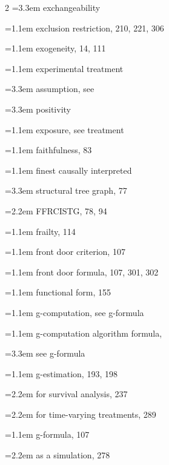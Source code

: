 \begin{multicols}{2}
\hspace*{2.2em}\hangindent=3.3em exchangeability\par
\hangindent=1.1em exclusion restriction, 210, 221, 306\par
\hangindent=1.1em exogeneity, 14, 111\par
\hangindent=1.1em experimental treatment\par
\hspace*{2.2em}\hangindent=3.3em assumption, see\par
\hspace*{2.2em}\hangindent=3.3em positivity\par
\hangindent=1.1em exposure, see treatment\par
\hangindent=1.1em faithfulness, 83\par
\hangindent=1.1em finest causally interpreted\par
\hspace*{2.2em}\hangindent=3.3em structural tree graph, 77\par
\hspace*{1.1em}\hangindent=2.2em FFRCISTG, 78, 94\par
\hangindent=1.1em frailty, 114\par
\hangindent=1.1em front door criterion, 107\par
\hangindent=1.1em front door formula, 107, 301, 302\par
\hangindent=1.1em functional form, 155\par
\hangindent=1.1em g-computation, see g-formula\par
\hangindent=1.1em g-computation algorithm formula,\par
\hspace*{2.2em}\hangindent=3.3em see g-formula\par
\hangindent=1.1em g-estimation, 193, 198\par
\hspace*{1.1em}\hangindent=2.2em for survival analysis, 237\par
\hspace*{1.1em}\hangindent=2.2em for time-varying treatments, 289\par
\hangindent=1.1em g-formula, 107\par
\hspace*{1.1em}\hangindent=2.2em as a simulation, 278\par

\end{multicols}
